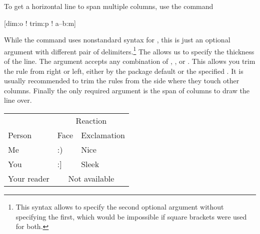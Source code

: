 To get a horizontal line to span multiple columns, use the command
\begin{lscommand}
  [dim:o ! trim:p ! a--b:m]
\end{lscommand}
While the command uses nonstandard syntax for , this is just an
optional argument with different pair of delimiters.\footnote{This syntax
allows to specify the second optional argument without specifying the first,
which would be impossible if square brackets were used for both.} The
 allows us to specify the thickness of the line. The 
argument accepts any combination of , ,
 or . This allows you trim the rule from right
or left, either by the package default or the specified . It is
usually recommended to trim the rules from the side where they touch other
columns. Finally the only required argument  is the span of columns
to draw the line over.
\begin{example}[examplewidth=0.43\linewidth]
\begin{tabular}{@{}lll@{}}
  \toprule
              & \multicolumn{2}{c}{
                  Reaction}        \\
  \cmidrule(l){2-3}
  Person      & Face & Exclamation \\
  \midrule
  Me          & :)   & Nice        \\
  You         & :]   & Sleek       \\
  Your reader & \multicolumn{2}{c}{
                  Not available}   \\
  \bottomrule
\end{tabular}
\end{example}

